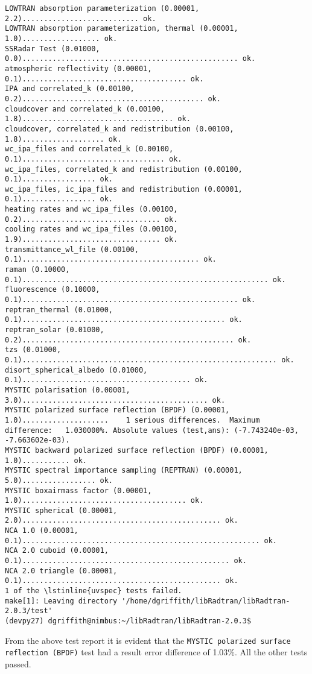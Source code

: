 \begin{enumerate}
\begin{lstlisting}[style=tinysize]
LOWTRAN absorption parameterization (0.00001,   2.2)........................... ok.
LOWTRAN absorption parameterization, thermal (0.00001,   1.0).................. ok.
SSRadar Test (0.01000,   0.0).................................................. ok.
atmospheric reflectivity (0.00001,   0.1)...................................... ok.
IPA and correlated_k (0.00100,   0.2).......................................... ok.
cloudcover and correlated_k (0.00100,   1.8)................................... ok.
cloudcover, correlated_k and redistribution (0.00100,   1.8)................... ok.
wc_ipa_files and correlated_k (0.00100,   0.1)................................. ok.
wc_ipa_files, correlated_k and redistribution (0.00100,   0.1)................. ok.
wc_ipa_files, ic_ipa_files and redistribution (0.00001,   0.1)................. ok.
heating rates and wc_ipa_files (0.00100,   0.2)................................ ok.
cooling rates and wc_ipa_files (0.00100,   1.9)................................ ok.
transmittance_wl_file (0.00100,   0.1)......................................... ok.
raman (0.10000,   0.1)......................................................... ok.
fluorescence (0.10000,   0.1).................................................. ok.
reptran_thermal (0.01000,   0.1)............................................... ok.
reptran_solar (0.01000,   0.2)................................................. ok.
tzs (0.01000,   0.1)........................................................... ok.
disort_spherical_albedo (0.01000,   0.1)....................................... ok.
MYSTIC polarisation (0.00001,   3.0)........................................... ok.
MYSTIC polarized surface reflection (BPDF) (0.00001,   1.0)....................    1 serious differences.  Maximum difference:   1.030000%. Absolute values (test,ans): (-7.743240e-03, -7.663602e-03).
MYSTIC backward polarized surface reflection (BPDF) (0.00001,   1.0)........... ok.
MYSTIC spectral importance sampling (REPTRAN) (0.00001,   5.0)................. ok.
MYSTIC boxairmass factor (0.00001,   1.0)...................................... ok.
MYSTIC spherical (0.00001,   2.0).............................................. ok.
NCA 1.0 (0.00001,   0.1)....................................................... ok.
NCA 2.0 cuboid (0.00001,   0.1)................................................ ok.
NCA 2.0 triangle (0.00001,   0.1).............................................. ok.
1 of the \lstinline{uvspec} tests failed.
make[1]: Leaving directory '/home/dgriffith/libRadtran/libRadtran-2.0.3/test'
(devpy27) dgriffith@nimbus:~/libRadtran/libRadtran-2.0.3$
\end{lstlisting}

From the above test report it is evident that the \lstinline{MYSTIC polarized surface reflection (BPDF)} test had a result error difference of 1.03\%.
All the other tests passed.

\end{enumerate}


